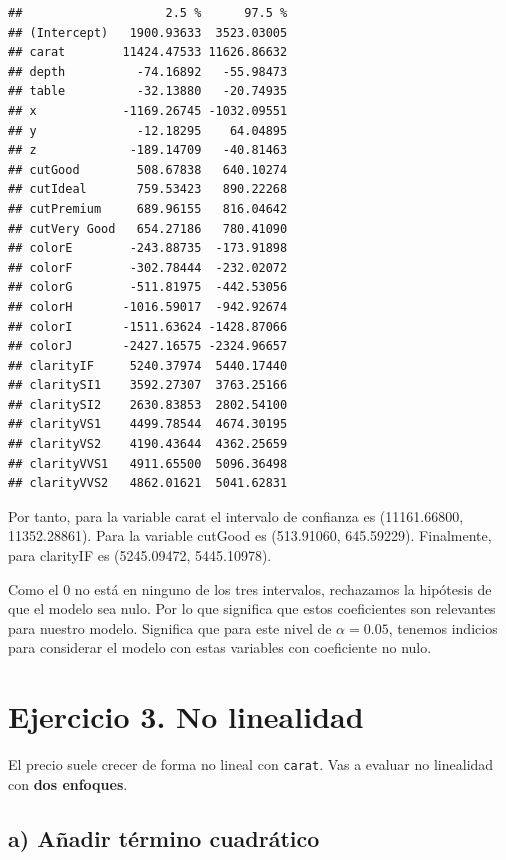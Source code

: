 \documentclass[
  spanish,
]{article}
\begin{document}
\begin{verbatim}
##                    2.5 %      97.5 %
## (Intercept)   1900.93633  3523.03005
## carat        11424.47533 11626.86632
## depth          -74.16892   -55.98473
## table          -32.13880   -20.74935
## x            -1169.26745 -1032.09551
## y              -12.18295    64.04895
## z             -189.14709   -40.81463
## cutGood        508.67838   640.10274
## cutIdeal       759.53423   890.22268
## cutPremium     689.96155   816.04642
## cutVery Good   654.27186   780.41090
## colorE        -243.88735  -173.91898
## colorF        -302.78444  -232.02072
## colorG        -511.81975  -442.53056
## colorH       -1016.59017  -942.92674
## colorI       -1511.63624 -1428.87066
## colorJ       -2427.16575 -2324.96657
## clarityIF     5240.37974  5440.17440
## claritySI1    3592.27307  3763.25166
## claritySI2    2630.83853  2802.54100
## clarityVS1    4499.78544  4674.30195
## clarityVS2    4190.43644  4362.25659
## clarityVVS1   4911.65500  5096.36498
## clarityVVS2   4862.01621  5041.62831
\end{verbatim}

Por tanto, para la variable carat el intervalo de confianza es
(11161.66800, 11352.28861). Para la variable cutGood es (513.91060,
645.59229). Finalmente, para clarityIF es (5245.09472, 5445.10978).

Como el 0 no está en ninguno de los tres intervalos, rechazamos la
hipótesis de que el modelo sea nulo. Por lo que significa que estos
coeficientes son relevantes para nuestro modelo. Significa que para este
nivel de \(\alpha = 0.05\), tenemos indicios para considerar el modelo
con estas variables con coeficiente no nulo.

\section*{Ejercicio 3. No linealidad}\label{ejercicio-3.-no-linealidad}

El precio suele crecer de forma no lineal con \texttt{carat}. Vas a
evaluar no linealidad con \textbf{dos enfoques}.

\subsection*{a) Añadir término
cuadrático}\label{a-auxf1adir-tuxe9rmino-cuadruxe1tico}
\end{document}

